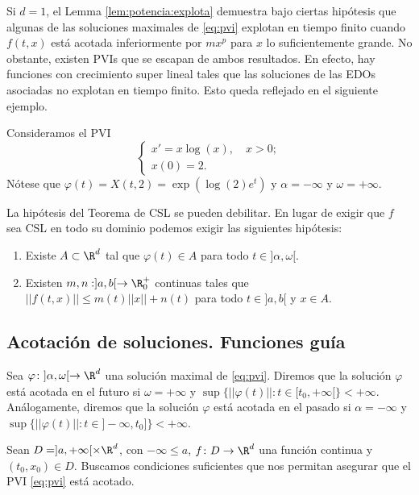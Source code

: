 \documentclass{article}
\begin{document}
Si $d = 1$, el Lemma \ref{lem:potencia:explota} demuestra bajo ciertas hipótesis que algunas de las
soluciones maximales de \eqref{eq:pvi} explotan en tiempo finito cuando $f(t,x)$ está acotada
inferiormente por $mx^p$ para $x$ lo suficientemente grande. No obstante, existen PVIs que se
escapan de ambos resultados. En efecto, hay funciones con crecimiento super lineal tales que las
soluciones de las EDOs asociadas no explotan en tiempo finito. Esto queda reflejado en el siguiente
ejemplo.

\begin{ex}
  Consideramos el PVI
  \[
    \begin{cases}
      x' = x \log(x), \quad x > 0; \\
      x(0) = 2.
    \end{cases}
  \]
  Nótese que $\varphi(t) = X(t, 2) = \exp(\log(2) e^t)$ y $\alpha = -\infty$ y $\omega = +\infty$.
\end{ex}

\begin{remark}
  La hipótesis del Teorema de CSL se pueden debilitar. En lugar de exigir que $f$ sea CSL en todo su
  dominio podemos exigir las siguientes hipótesis:
  
  \begin{enumerate}
  \item Existe $A \subset \R^d$ tal que $\varphi(t) \in A$ para todo $t \in ]\alpha, \omega[$.
  \item Existen $m, n: ]a,b[ \to \R_0^+$ continuas tales que $||f(t,x)|| \le m(t) ||x|| + n(t)$ para
    todo $t \in ]a,b[$ y $x \in A$.
  \end{enumerate}
\end{remark}

\subsection{Acotación de soluciones. Funciones guía}

\begin{definition}
  Sea $\varphi \colon ]\alpha, \omega[ \to \R^d$ una solución maximal de \eqref{eq:pvi}. Diremos que
  la solución $\varphi$ está acotada en el futuro si $\omega = +\infty$ y
  $\sup \{||\varphi(t)||: t \in [t_0, +\infty[\} < +\infty$. Análogamente, diremos que la solución
  $\varphi$ está acotada en el pasado si $\alpha = -\infty$ y
  $\sup \{||\varphi(t)||: t \in ]-\infty, t_0]\} < +\infty$.
\end{definition}

Sean $D = ]a, +\infty[ \times \R^d$, con $-\infty \le a$, $f\colon D \to \R^d$ una función continua
y $(t_0, x_0) \in D$. Buscamos condiciones suficientes que nos permitan asegurar que el PVI
\eqref{eq:pvi} está acotado.
\end{document}
